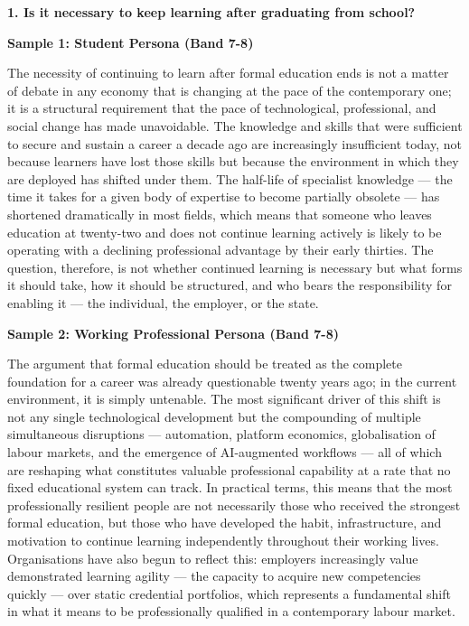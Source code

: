 \begin{ieltsquestion}
\textbf{1. Is it necessary to keep learning after graduating from school?}
\end{ieltsquestion}
\textbf{Sample 1: Student Persona (Band 7-8)}

The necessity of continuing to learn after formal education ends is not a matter of debate in any economy that is changing at the pace of the contemporary one; it is a structural requirement that the pace of technological, professional, and social change has made unavoidable. The knowledge and skills that were sufficient to secure and sustain a career a decade ago are increasingly insufficient today, not because learners have lost those skills but because the environment in which they are deployed has shifted under them. The half-life of specialist knowledge — the time it takes for a given body of expertise to become partially obsolete — has shortened dramatically in most fields, which means that someone who leaves education at twenty-two and does not continue learning actively is likely to be operating with a declining professional advantage by their early thirties. The question, therefore, is not whether continued learning is necessary but what forms it should take, how it should be structured, and who bears the responsibility for enabling it — the individual, the employer, or the state.

\textbf{Sample 2: Working Professional Persona (Band 7-8)}

The argument that formal education should be treated as the complete foundation for a career was already questionable twenty years ago; in the current environment, it is simply untenable. The most significant driver of this shift is not any single technological development but the compounding of multiple simultaneous disruptions — automation, platform economics, globalisation of labour markets, and the emergence of AI-augmented workflows — all of which are reshaping what constitutes valuable professional capability at a rate that no fixed educational system can track. In practical terms, this means that the most professionally resilient people are not necessarily those who received the strongest formal education, but those who have developed the habit, infrastructure, and motivation to continue learning independently throughout their working lives. Organisations have also begun to reflect this: employers increasingly value demonstrated learning agility — the capacity to acquire new competencies quickly — over static credential portfolios, which represents a fundamental shift in what it means to be professionally qualified in a contemporary labour market.

